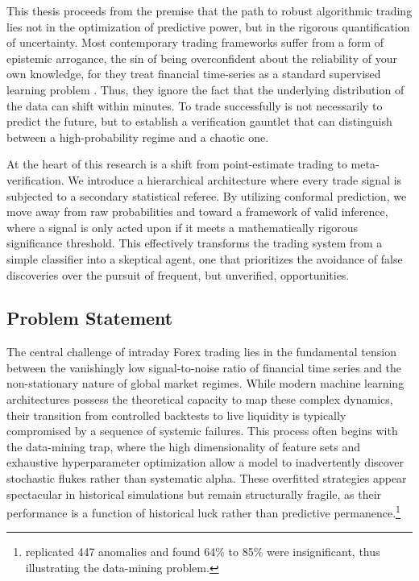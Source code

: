 \documentclass[12pt, a4paper]{article}
\begin{document}
\medskip

This thesis proceeds from the premise that the path to robust algorithmic trading lies not in the optimization of predictive power,
but in the rigorous quantification of uncertainty. Most contemporary trading frameworks suffer from
a form of epistemic arrogance, the sin of being overconfident about the reliability of your own knowledge,
for they treat financial time-series as a standard supervised learning problem \parencite{ouma2025epistemic}.
Thus, they ignore the fact that the underlying distribution of the data can shift within minutes.
To trade successfully is not necessarily to predict the future, but to establish a verification gauntlet
that can distinguish between a high-probability regime and a chaotic one.

\medskip

At the heart of this research is a shift from point-estimate trading to meta-verification.
We introduce a hierarchical architecture where every trade signal is subjected to a secondary statistical referee.
By utilizing conformal prediction, we move away from raw probabilities and toward a framework of valid inference,
where a signal is only acted upon if it meets a mathematically rigorous significance threshold.
This effectively transforms the trading system from a simple classifier into a skeptical agent, 
one that prioritizes the avoidance of false discoveries over the pursuit of frequent, but unverified, opportunities.


\subsection{Problem Statement}\label{sec:problem_statement}

The central challenge of intraday Forex trading lies in the fundamental tension between the vanishingly low signal-to-noise ratio of 
financial time series and the non-stationary nature of global market regimes.
While modern machine learning architectures possess the theoretical capacity to map these complex dynamics, 
their transition from controlled backtests to live liquidity is typically compromised by a sequence of systemic failures.
This process often begins with the data-mining trap, where the high dimensionality of feature sets and 
exhaustive hyperparameter optimization allow a model to inadvertently discover stochastic flukes rather than systematic alpha.
These overfitted strategies appear spectacular in historical simulations but remain structurally fragile, 
as their performance is a function of historical luck rather than predictive permanence.\footnote{\textcite{hou2020replicating} replicated 
447 anomalies and found 64\% to 85\% were insignificant, thus illustrating the data-mining problem.}
\end{document}
